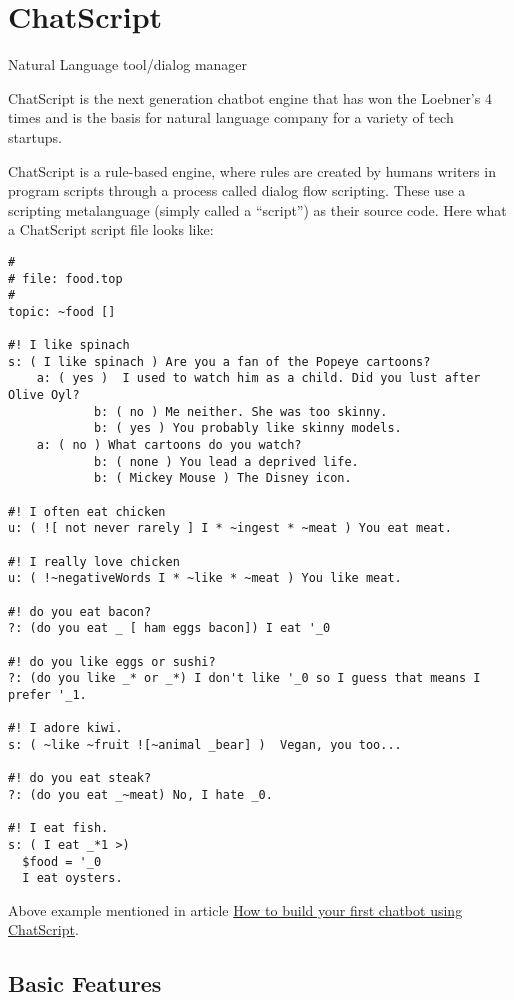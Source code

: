 \documentclass[]{article}
\date{}
\begin{document}
\section{ChatScript}\label{chatscript}

Natural Language tool/dialog manager

ChatScript is the next generation chatbot engine that has won the
Loebner's 4 times and is the basis for natural language company for a
variety of tech startups.

ChatScript is a rule-based engine, where rules are created by humans
writers in program scripts through a process called dialog flow
scripting. These use a scripting metalanguage (simply called a
``script'') as their source code. Here what a ChatScript script file
looks like:

\begin{verbatim}
#
# file: food.top
#
topic: ~food []

#! I like spinach
s: ( I like spinach ) Are you a fan of the Popeye cartoons?
    a: ( yes )  I used to watch him as a child. Did you lust after Olive Oyl?
            b: ( no ) Me neither. She was too skinny.
            b: ( yes ) You probably like skinny models.
    a: ( no ) What cartoons do you watch?
            b: ( none ) You lead a deprived life.
            b: ( Mickey Mouse ) The Disney icon.

#! I often eat chicken
u: ( ![ not never rarely ] I * ~ingest * ~meat ) You eat meat.

#! I really love chicken
u: ( !~negativeWords I * ~like * ~meat ) You like meat.

#! do you eat bacon?
?: (do you eat _ [ ham eggs bacon]) I eat '_0

#! do you like eggs or sushi?
?: (do you like _* or _*) I don't like '_0 so I guess that means I prefer '_1.

#! I adore kiwi.
s: ( ~like ~fruit ![~animal _bear] )  Vegan, you too...

#! do you eat steak?
?: (do you eat _~meat) No, I hate _0.

#! I eat fish.
s: ( I eat _*1 >) 
  $food = '_0 
  I eat oysters.
\end{verbatim}

Above example mentioned in article
\href{https://medium.freecodecamp.com/chatscript-for-beginners-chatbots-developers-c58bb591da8\#.2qdxjuyvs}{How
to build your first chatbot using ChatScript}.

\subsection{Basic Features}\label{basic-features}
\end{document}
